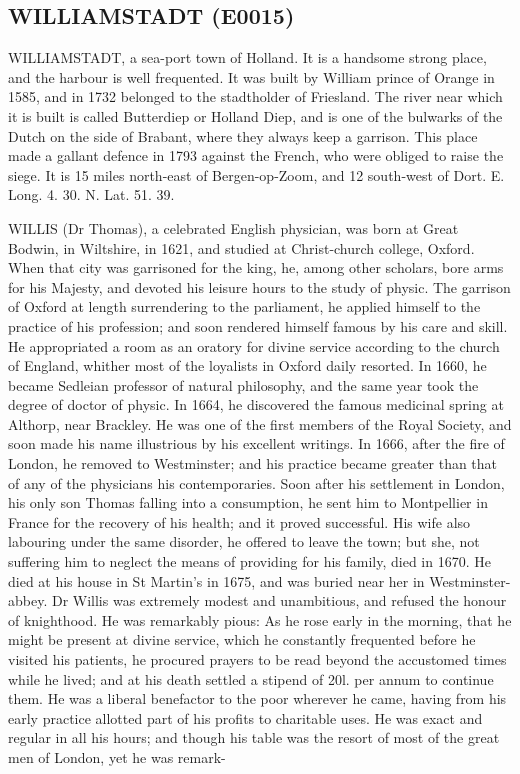 \documentclass{article}
\begin{document}
\subsection*{WILLIAMSTADT (E0015)}
WILLIAMSTADT, a sea-port town of Holland. It is a handsome strong place, and the harbour is well frequented. It was built by William prince of Orange in 1585, and in 1732 belonged to the stadtholder of Friesland. The river near which it is built is called Butterdiep or Holland Diep, and is one of the bulwarks of the Dutch on the side of Brabant, where they always keep a garrison. This place made a gallant defence in 1793 against the French, who were obliged to raise the siege. It is 15 miles north-east of Bergen-op-Zoom, and 12 south-west of Dort. E. Long. 4. 30. N. Lat. 51. 39.

WILLIS (Dr Thomas), a celebrated English physician, was born at Great Bodwin, in Wiltshire, in 1621, and studied at Christ-church college, Oxford. When that city was garrisoned for the king, he, among other scholars, bore arms for his Majesty, and devoted his leisure hours to the study of physic. The garrison of Oxford at length surrendering to the parliament, he applied himself to the practice of his profession; and soon rendered himself famous by his care and skill. He appropriated a room as an oratory for divine service according to the church of England, whither most of the loyalists in Oxford daily resorted. In 1660, he became Sedleian professor of natural philosophy, and the same year took the degree of doctor of physic. In 1664, he discovered the famous medicinal spring at Althorp, near Brackley. He was one of the first members of the Royal Society, and soon made his name illustrious by his excellent writings. In 1666, after the fire of London, he removed to Westminster; and his practice became greater than that of any of the physicians his contemporaries. Soon after his settlement in London, his only son Thomas falling into a consumption, he sent him to Montpellier in France for the recovery of his health; and it proved successful. His wife also labouring under the same disorder, he offered to leave the town; but she, not suffering him to neglect the means of providing for his family, died in 1670. He died at his house in St Martin's in 1675, and was buried near her in Westminster-abbey. Dr Willis was extremely modest and unambitious, and refused the honour of knighthood. He was remarkably pious: As he rose early in the morning, that he might be present at divine service, which he constantly frequented before he visited his patients, he procured prayers to be read beyond the accustomed times while he lived; and at his death settled a stipend of 20l. per annum to continue them. He was a liberal benefactor to the poor wherever he came, having from his early practice allotted part of his profits to charitable uses. He was exact and regular in all his hours; and though his table was the resort of most of the great men of London, yet he was remark-
\end{document}
